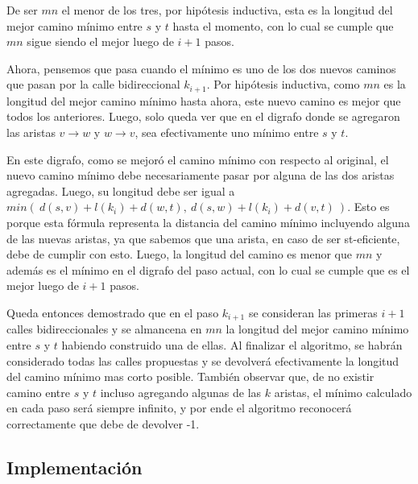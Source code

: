 De ser $mn$ el menor de los tres, por hipótesis inductiva, esta es la longitud del mejor camino mínimo entre $s$ y $t$ hasta el momento, con lo cual se cumple que $mn$ sigue siendo el mejor luego de $i+1$ pasos.

\vspace{1em}

Ahora, pensemos que pasa cuando el mínimo es uno de los dos nuevos caminos que pasan por la calle bidireccional $k_{i+1}$. Por hipótesis inductiva, como $mn$ es la longitud del mejor camino mínimo hasta ahora, este nuevo camino es mejor que todos los anteriores. Luego, solo queda ver que en el digrafo donde se agregaron las aristas $v \rightarrow w$ y $w \rightarrow v$, sea efectivamente uno mínimo entre $s$ y $t$. 

\vspace{1em}

En este digrafo, como se mejoró el camino mínimo con respecto al original, el nuevo camino mínimo debe necesariamente pasar por alguna de las dos aristas agregadas. Luego, su longitud debe ser igual a $min(\ d(s,v) + l(k_i) + d(w,t),\ d(s,w) + l(k_i) + d(v,t)\ )$. Esto es porque esta fórmula representa la distancia del camino mínimo incluyendo alguna de las nuevas aristas, ya que sabemos que una arista, en caso de ser st-eficiente, debe de cumplir con esto. Luego, la longitud del camino es menor que $mn$ y además es el mínimo en el digrafo del paso actual, con lo cual se cumple que es el mejor luego de $i+1$ pasos.

\vspace{1em}

Queda entonces demostrado que en el paso $k_{i+1}$ se consideran las primeras $i+1$ calles bidireccionales y se almancena en $mn$ la longitud del mejor camino mínimo entre $s$ y $t$ habiendo construido una de ellas. Al finalizar el algoritmo, se habrán considerado todas las calles propuestas y se devolverá efectivamente la longitud del camino mínimo mas corto posible. También observar que, de no existir camino entre $s$ y $t$ incluso agregando algunas de las $k$ aristas, el mínimo calculado en cada paso será siempre infinito, y por ende el algoritmo reconocerá correctamente que debe de devolver -1.

\pagebreak
\subsection{Implementación}
\vspace{1em}

